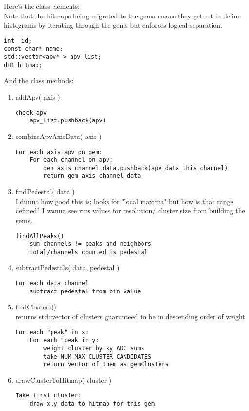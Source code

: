 \documentclass[11pt]{article}
\begin{document}
	Here's the class elements:\\
	Note that the hitmaps being migrated to the gems means they get set in define histograms by iterating through the gems but enforces logical separation.
	\begin{lstlisting} 
int  id;
const char* name;
std::vector<apv* > apv_list;
dH1 hitmap;
	\end{lstlisting} 
	
	And the class methods:
	\begin{enumerate}
		\item addApv( axis )
		\begin{lstlisting}
check apv
	apv_list.pushback(apv)
		\end{lstlisting}
		
		\item combineApvAxisData( axis )
		\begin{lstlisting}
For each axis_apv on gem:
	For each channel on apv:
		gem_axis_channel_data.pushback(apv_data_this_channel)
		return gem_axis_channel_data
		\end{lstlisting}
		
		\item findPedestal( data )\\
I dunno how good this is: looks for "local maxima" but how is that range defined? I wanna see rms values for resolution/ cluster size from building the gems.
		\begin{lstlisting}
findAllPeaks()
	sum channels != peaks and neighbors
	total/channels counted is pedestal		
		\end{lstlisting}
	
		\item subtractPedestals( data, pedestal )
		\begin{lstlisting}
For each data channel
	subtract pedestal from bin value
		\end{lstlisting}
		
		\item findClusters()\\
		returns std::vector of clusters guarunteed to be in descending order of weight
		\begin{lstlisting}
For each "peak" in x:
	For each "peak in y:
		weight cluster by xy ADC sums
		take NUM_MAX_CLUSTER_CANDIDATES
		return vector of them as gemClusters
		\end{lstlisting}
		
		\item drawClusterToHitmap( cluster ) 
		\begin{lstlisting}
Take first cluster:
	draw x,y data to hitmap for this gem
		\end{lstlisting}
		

\end{enumerate}
\end{document}
